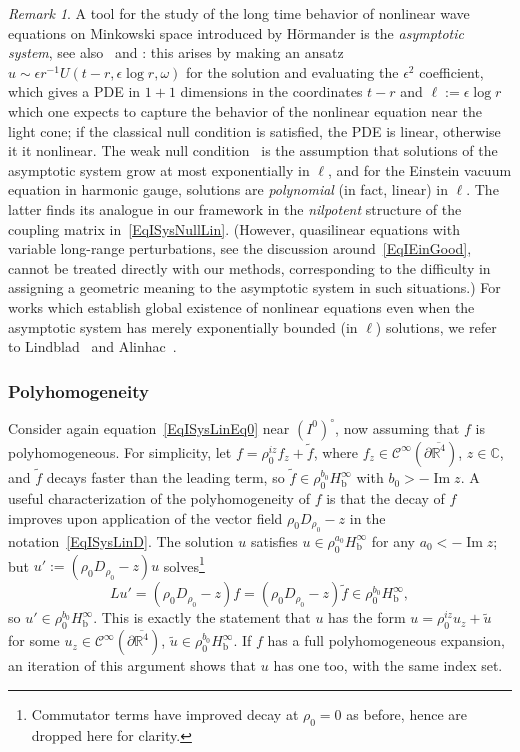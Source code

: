 \documentclass[reqno,11pt,letterpaper]{amsart}
\numberwithin{equation}{section}
\numberwithin{figure}{section}
\theoremstyle{definition}
\theoremstyle{remark}
\newtheorem{rmk}[thm]{Remark}
\newcommand{\mc}{\mathcal}
\newcommand{\cC}{\mc C}
\newcommand{\C}{\mathbb{C}}
\newcommand{\R}{\mathbb{R}}
\renewcommand{\Im}{\operatorname{Im}}
\newcommand{\eps}{\epsilon}
\newcommand{\ol}{\overline}
\newcommand{\pa}{\partial}
\newcommand{\wt}{\widetilde}
\newcommand{\bop}{{\mathrm{b}}}
\newcommand{\CI}{\cC^\infty}
\newcommand{\Hb}{H_{\bop}}
\begin{document}
\begin{rmk}
\label{RmkISysWeakNull}
  A tool for the study of the long time behavior of nonlinear wave equations on Minkowski space introduced by H\"ormander \cite{HormanderLifespan} is the \emph{asymptotic system}, see also~\cite[\S6.5]{HormanderNonlinearLectures} and \cite{LindbladRodnianskiWeakNull}: this arises by making an ansatz $u\sim \eps r^{-1} U(t-r,\eps\log r,\omega)$ for the solution and evaluating the $\eps^2$ coefficient, which gives a PDE in $1+1$ dimensions in the coordinates $t-r$ and $\ell:=\eps\log r$ which one expects to capture the behavior of the nonlinear equation near the light cone; if the classical null condition is satisfied, the PDE is linear, otherwise it it nonlinear. The weak null condition~\cite{LindbladRodnianskiWeakNull} is the assumption that solutions of the asymptotic system grow at most exponentially in $\ell$, and for the Einstein vacuum equation in harmonic gauge, solutions are \emph{polynomial} (in fact, linear) in $\ell$. The latter finds its analogue in our framework in the \emph{nilpotent} structure of the coupling matrix in~\eqref{EqISysNullLin}. (However, quasilinear equations with variable long-range perturbations, see the discussion around~\eqref{EqIEinGood}, cannot be treated directly with our methods, corresponding to the difficulty in assigning a geometric meaning to the asymptotic system in such situations.) For works which establish global existence of nonlinear equations even when the asymptotic system has merely exponentially bounded (in $\ell$) solutions, we refer to Lindblad~\cite{LindbladGlobalNonlinear,LindbladGlobalQuasilinear} and Alinhac~\cite{AlinhacBlowupAtInfty}.
\end{rmk}






\subsubsection{Polyhomogeneity}
\label{SssISysPhg}

Consider again equation~\eqref{EqISysLinEq0} near $(I^0)^\circ$, now assuming that $f$ is polyhomogeneous. For simplicity, let $f=\rho_0^{i z}f_z+\wt f$, where $f_z\in\CI(\pa\ol{\R^4})$, $z\in\C$, and $\wt f$ decays faster than the leading term, so $\wt f\in\rho_0^{b_0}\Hb^\infty$ with $b_0>-\Im z$. A useful characterization of the polyhomogeneity of $f$ is that the decay of $f$ improves upon application of the vector field $\rho_0 D_{\rho_0}-z$ in the notation~\eqref{EqISysLinD}. The solution $u$ satisfies $u\in\rho_0^{a_0}\Hb^\infty$ for any $a_0<-\Im z$; but $u':=(\rho_0 D_{\rho_0}-z)u$ solves\footnote{Commutator terms have improved decay at $\rho_0=0$ as before, hence are dropped here for clarity.}
\[
  L u' = (\rho_0 D_{\rho_0}-z)f = (\rho_0 D_{\rho_0}-z)\wt f \in \rho_0^{b_0}\Hb^\infty,
\]
so $u'\in\rho_0^{b_0}\Hb^\infty$. This is exactly the statement that $u$ has the form $u=\rho_0^{i z}u_z+\wt u$ for some $u_z\in\CI(\pa\ol{\R^4})$, $\wt u\in\rho_0^{b_0}\Hb^\infty$. If $f$ has a full polyhomogeneous expansion, an iteration of this argument shows that $u$ has one too, with the same index set.
\end{document}
